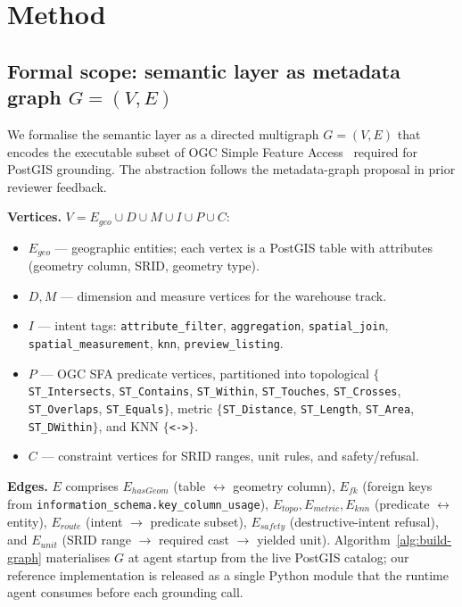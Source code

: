 \documentclass[11pt]{article}
\begin{document}
\section{Method}
\label{sec:method}

\subsection{Formal scope: semantic layer as metadata graph \texorpdfstring{$G=(V,E)$}{G=(V,E)}}
\label{sec:formal-scope}

We formalise the semantic layer as a directed multigraph $G = (V, E)$ that
encodes the executable subset of OGC Simple Feature Access~\citep{ogcsfs}
required for PostGIS grounding. The abstraction follows the metadata-graph
proposal in prior reviewer feedback.

\noindent\textbf{Vertices.} $V = E_{geo} \cup D \cup M \cup I \cup P \cup C$:
\begin{itemize}[leftmargin=*,nosep]
\item $E_{geo}$ --- geographic entities; each vertex is a PostGIS table with
  attributes (geometry column, SRID, geometry type).
\item $D, M$ --- dimension and measure vertices for the warehouse track.
\item $I$ --- intent tags: \texttt{attribute\_filter}, \texttt{aggre\-gation},
  \texttt{spatial\_join}, \texttt{spatial\_measurement}, \texttt{knn},
  \texttt{preview\_listing}.
\item $P$ --- OGC SFA predicate vertices, partitioned into topological
  $\{$\texttt{ST\_Intersects}, \texttt{ST\_Contains}, \texttt{ST\_Within},
  \texttt{ST\_Touches}, \texttt{ST\_Crosses}, \texttt{ST\_Overlaps},
  \texttt{ST\_Equals}$\}$, metric $\{$\texttt{ST\_Distance},
  \texttt{ST\_Length}, \texttt{ST\_Area}, \texttt{ST\_DWithin}$\}$, and KNN
  $\{$\texttt{<->}$\}$.
\item $C$ --- constraint vertices for SRID ranges, unit rules, and
  safety/refusal.
\end{itemize}

{\sloppy\noindent\textbf{Edges.} $E$ comprises $E_{hasGeom}$ (table $\leftrightarrow$
geometry column), $E_{fk}$ (foreign keys from
\texttt{information\_schema.\allowbreak{}key\_column\_\allowbreak{}usage}),
$E_{topo}, E_{metric}, E_{knn}$ (predicate $\leftrightarrow$ entity),
$E_{route}$ (intent $\to$ predicate subset),
$E_{safety}$ (destructive-intent refusal), and
$E_{unit}$ (SRID range $\to$ required cast $\to$ yielded unit).
Algorithm~\ref{alg:build-graph} materialises $G$ at agent startup from the
live PostGIS catalog; our reference implementation is released as a single
Python module that the runtime agent consumes before each grounding call.\par}
\end{document}
